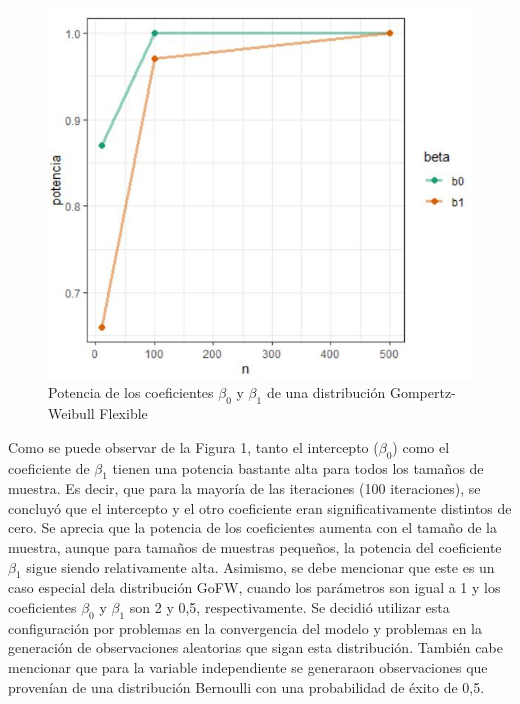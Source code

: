 \documentclass[12pt,a4paper]{article}
\begin{document}
\begin{figure}[h!]
\begin{center}
\includegraphics[scale=0.75]{potencia.JPG} 
\caption{Potencia de los coeficientes $\beta_0$ y $\beta_1$ de una distribución Gompertz-Weibull Flexible}
\end{center}
\end{figure}

Como se puede observar de la Figura 1, tanto el intercepto ($\beta_0$) como el coeficiente de $\beta_1$ tienen una potencia bastante alta para todos los tamaños de muestra. Es decir, que para la mayoría de las iteraciones (100 iteraciones), se concluyó que el intercepto y el otro coeficiente eran significativamente distintos de cero. Se aprecia que la potencia de los coeficientes aumenta con el tamaño de la muestra, aunque para tamaños de muestras pequeños, la potencia del coeficiente $\beta_1$ sigue siendo relativamente alta. Asimismo, se debe mencionar que este es un caso especial dela distribución GoFW, cuando los parámetros son igual a 1 y los coeficientes $\beta_0$ y $\beta_1$ son 2 y 0,5, respectivamente. Se decidió utilizar esta configuración por problemas en la convergencia del modelo y problemas en la generación de observaciones aleatorias que sigan esta distribución. También cabe mencionar que para la variable independiente se generaraon observaciones que provenían de una distribución Bernoulli con una probabilidad de éxito de 0,5.
\newpage
\end{document}
